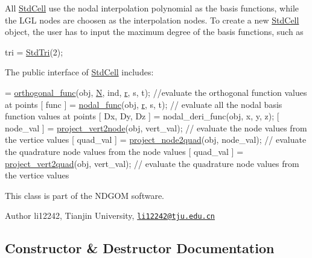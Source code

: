 All \hyperlink{class_std_cell}{Std\+Cell} use the nodal interpolation polynomial as the basis functions, while the L\+GL nodes are choosen as the interpolation nodes. To create a new \hyperlink{class_std_cell}{Std\+Cell} object, the user has to input the maximum degree of the basis functions, such as 
\begin{DoxyCode}
tri = \hyperlink{class_std_tri}{StdTri}(2); %
\end{DoxyCode}
The public interface of \hyperlink{class_std_cell}{Std\+Cell} includes\+: 
\begin{DoxyCode}
[ func ] = \hyperlink{class_std_cell_a3bf9f78e246c520bb4e8d2f7847774e7}{orthogonal\_func}(obj, \hyperlink{class_std_cell_a8df35ad5169af36d3dff62644f7878c9}{N}, ind, \hyperlink{class_std_cell_a737dd2feb25f74be0215a594334ec622}{r}, s, t); \textcolor{comment}{//evaluate the orthogonal function
       values at points}
[ func ] = \hyperlink{class_std_cell_acad53d6f288d6e8982e87ffc0efcc8b1}{nodal\_func}(obj, \hyperlink{class_std_cell_a737dd2feb25f74be0215a594334ec622}{r}, s, t); \textcolor{comment}{// evaluate all the nodal basis function values at points}
[ Dx, Dy, Dz ] = nodal\_deri\_func(obj, x, y, z);
[ node\_val ] = \hyperlink{class_std_cell_a2d257d7d23bc6a820371b29a758e8814}{project\_vert2node}(obj, vert\_val); \textcolor{comment}{// evaluate the node values from the
       vertice values}
[ quad\_val ] = \hyperlink{class_std_cell_a2bfe27e9231a19e50b70d22c3b0d85bc}{project\_node2quad}(obj, node\_val); \textcolor{comment}{// evaluate the quadrature node values
       from the node values}
[ quad\_val ] = \hyperlink{class_std_cell_ae88829dd3d3390a4b1188186ec3dfb7b}{project\_vert2quad}(obj, vert\_val); \textcolor{comment}{// evaluate the quadrature node values
       from the vertice values}
\end{DoxyCode}
 This class is part of the N\+D\+G\+OM software. \begin{DoxyAuthor}{Author}
li12242, Tianjin University, \href{mailto:li12242@tju.edu.cn}{\tt li12242@tju.\+edu.\+cn} 
\end{DoxyAuthor}


\subsection{Constructor \& Destructor Documentation}
\mbox{\label{class_std_cell_a077bac0ebed5538704a6fc1de3c70548}} 
